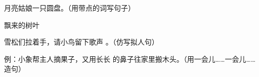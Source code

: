 \documentclass[a4paper, zihao = -4, unicodeGBMath, fontset=sourcesans, %
]{ctexart}
\begin{document}
  \begin{qus}
  \item 月亮姑娘一只圆盘。（用带点的词写句子）

    飘来的树叶

  \item 雪松们拉着手，请小鸟留下歌声 。（仿写拟人句）


  \item 例：小象帮主人摘果子，又用长长
    的鼻子往家里搬木头。（用一会儿……一会儿……造句）

    \oneline{} %

    \oneline{}

  \end{qus}

\end{document}
